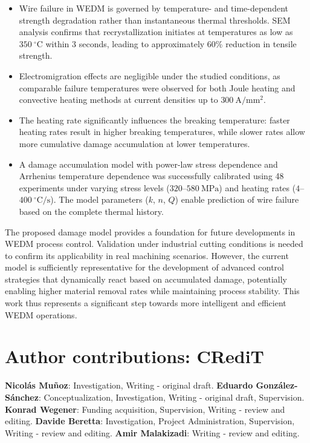 \documentclass[5p,times,procedia]{elsarticle}
\begin{document}
\begin{itemize}
    \item Wire failure in WEDM is governed by temperature- and time-dependent strength degradation rather than instantaneous thermal thresholds. SEM analysis confirms that recrystallization initiates at temperatures as low as $350~\mathrm{^\circ C}$ within 3 seconds, leading to approximately 60\% reduction in tensile strength. 
    
    \item Electromigration effects are negligible under the studied conditions, as comparable failure temperatures were observed for both Joule heating and convective heating methods at current densities up to $300~\mathrm{A/mm^2}$.
    
    \item The heating rate significantly influences the breaking temperature: faster heating rates result in higher breaking temperatures, while slower rates allow more cumulative damage accumulation at lower temperatures.
    
    \item A damage accumulation model with power-law stress dependence and Arrhenius temperature dependence was successfully calibrated using 48 experiments under varying stress levels ($320$--$580~\mathrm{MPa}$) and heating rates ($4$--$400~\mathrm{^\circ C/s}$). The model parameters ($k$, $n$, $Q$) enable prediction of wire failure based on the complete thermal history.
    
\end{itemize}

The proposed damage model provides a foundation for future developments in WEDM process control. Validation under industrial cutting conditions is needed to confirm its applicability in real machining scenarios. However, the current model is sufficiently representative for the development of advanced control strategies that dynamically react based on accumulated damage, potentially enabling higher material removal rates while maintaining process stability. This work thus represents a significant step towards more intelligent and efficient WEDM operations.


\section*{Author contributions: CRediT}
\textbf{Nicolás Muñoz}:  Investigation, Writing - original draft. \textbf{Eduardo González-Sánchez}: Conceptualization, Investigation, Writing - original draft, Supervision. \textbf{Konrad Wegener}: Funding acquisition, Supervision, Writing - review and editing. \textbf{Davide Beretta}: Investigation, Project Administration, Supervision, Writing - review and editing. \textbf{Amir Malakizadi}: Writing - review and editing.
\end{document}
